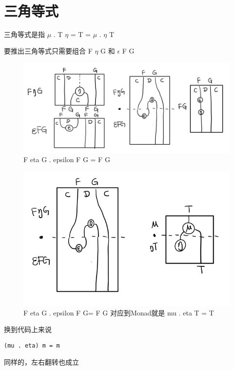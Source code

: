 \documentclass[letterspacing]{tufte-book}
\begin{document}
\section{三角等式}
\label{sec:org2d6499d}

三角等式是指 \(\mu\) . T \(\eta\) = T = \(\mu\) . \(\eta\) T

要推出三角等式只需要组合 F \(\eta\) G 和 \(\epsilon\) F G
\begin{figure}[htbp]
\centering
\includegraphics[width=.9\linewidth]{images/p1-adjunction-functor-triangle.png}
\caption{F eta G  . epsilon F G = F G}
\end{figure}
\begin{figure}[htbp]
\centering
\includegraphics[width=.9\linewidth]{images/p1-monad-triangle.png}
\caption{F eta G  . epsilon F G= F G 对应到Monad就是 mu . eta T = T}
\end{figure}

换到代码上来说
\lstset{language=haskell,label= ,caption= ,captionpos=b,numbers=none}
\begin{lstlisting}
(mu . eta) m = m
\end{lstlisting}

同样的，左右翻转也成立
\end{document}
